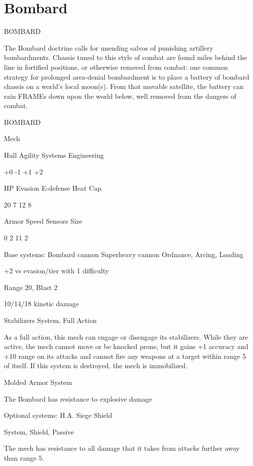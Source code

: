 \section{Bombard}

                                             BOMBARD

The Bombard doctrine calls for unending salvos of punishing artillery bombardments. Chassis
tuned to this style of combat are found miles behind the line in fortified positions, or otherwise
removed from combat: one common strategy for prolonged area-denial bombardment is to place
a battery of bombard chassis on a world’s local moon(s). From that movable satellite, the battery
can rain FRAMEs down upon the world below, well removed from the dangers of combat.


       BOMBARD

       Mech

       Hull      Agility     Systems       Engineering

       +0        -1          +1            +2

       HP        Evasion     E-defense     Heat Cap.

       20        7            12           8

      Armor      Speed       Sensors       Size

       0         2            11           2

Base systems:
Bombard cannon
Superheavy cannon
Ordnance, Arcing, Loading

+2 vs evasion/tier with 1 difficulty

Range 20, Blast 2

10/14/18 kinetic damage


Stabilizers
System, Full Action

As a full action, this mech can engage or disengage its stabilizers. While they are active, the
mech cannot move or be knocked prone, but it gains +1 accuracy and +10 range on its attacks
and cannot fire any weapons at a target within range 5 of itself. If this system is destroyed, the
mech is immobilized.


Molded Armor
System

The Bombard has resistance to explosive damage


Optional systems:
H.A. Siege Shield




System, Shield, Passive

The mech has resistance to all damage that it takes from attacks further away than range 5.


